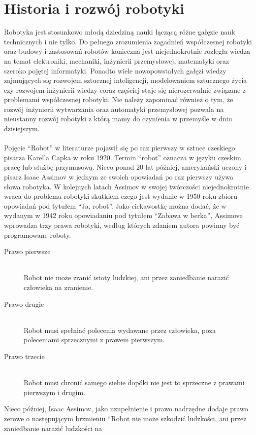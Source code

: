 \section{Historia i rozwój robotyki}
Robotyka jest stosunkowo młodą dziedziną nauki łączącą różne gałęzie nauk
technicznych i nie tylko. Do pełnego zrozumienia zagadnień współczesnej robotyki
oraz budowy i zastosowań robotów konieczna jest niejednokrotnie rozległa wiedza
na temat elektroniki, mechaniki, inżynierii przemysłowej, matematyki oraz
szeroko pojętej informatyki. Ponadto wiele nowopowstałych gałęzi wiedzy
zajmujących się rozwojem sztucznej inteligencji, modelowaniem sztucznego życia czy rozwojem
inżynierii wiedzy coraz częściej staje się nierozerwalnie związane z problemami
współczesnej robotyki. Nie należy zapominać również o tym, że rozwój inżynierii
wytwarzania oraz automatyki przemysłowej pozwala na nieustanny rozwój robotyki z
którą mamy do czynienia w przemyśle w dniu dzisiejszym.\\
\\
Pojęcie ``Robot'' w literaturze pojawił się po raz pierwszy w sztuce czeskiego
pisarza Karel'a Capka w roku 1920. Termin ``robot'' oznacza w języku czeskim
pracę lub służbę przymusową. Nieco ponad 20 lat później, amerykański uczony i
pisarz Isaac Assimov w jednym ze swoich opowiadań po raz pierwszy używa słowa
robotyka. W kolejnych latach Assimov w swojej twórczości niejednokrotnie wraca
do problemu robotyki skutkiem czego jest wydanie w 1950 roku zbioru opowiadań
pod tytułem ``Ja, robot''. Jako ciekawostkę można dodać, że w wydanym w 1942
roku opowiadaniu pod tytułem ``Zabawa w berka'', Assimove wprowadza trzy prawa
robotyki, według których zdaniem autora powinny być programowane roboty.
\begin{description}
\item[Prawo pierwsze] \hfill \\
Robot nie może zranić istoty ludzkiej, ani przez zaniedbanie narazić człowieka
na zranienie. 
\item[Prawo drugie] \hfill \\
Robot musi spełniać polecenia wydawane przez człowieka, poza poleceniami
sprzecznymi z prawem pierwszym.
\item[Prawo trzecie] \hfill \\
Robot musi chronić samego siebie dopóki nie jest to sprzeczne z prawami
pierwszym i drugim.
\end{description} 
Nieco później, Isaac Assimov, jako uzupełnienie i prawo nadrzędne dodaje prawo
zerowe o następującym brzmieniu ``Robot nie może szkodzić ludzkości, ani przez zaniedbanie narazić ludzkości na
